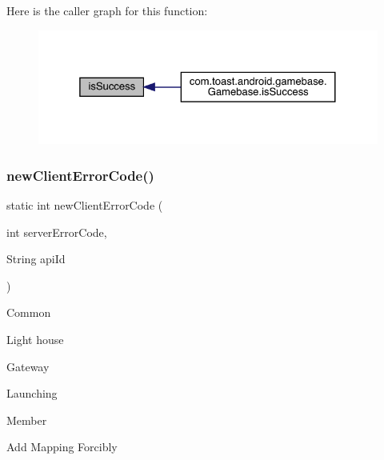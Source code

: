Here is the caller graph for this function\+:
\nopagebreak
\begin{figure}[H]
\begin{center}
\leavevmode
\includegraphics[width=325pt]{classcom_1_1toast_1_1android_1_1gamebase_1_1base_1_1_gamebase_error_a7d24434216b8c296f9c1382422267daf_icgraph}
\end{center}
\end{figure}
\mbox{\label{classcom_1_1toast_1_1android_1_1gamebase_1_1base_1_1_gamebase_error_ae1e31671405d6d3c4660aacf9d9dd3c5}} 
\subsubsection{\texorpdfstring{new\+Client\+Error\+Code()}{newClientErrorCode()}}
{\footnotesize\ttfamily static int new\+Client\+Error\+Code (\begin{DoxyParamCaption}\item[{int}]{server\+Error\+Code,  }\item[{String}]{api\+Id }\end{DoxyParamCaption})\hspace{0.3cm}{\ttfamily [static]}}

Common

Light house

Gateway

Launching

Member

Add Mapping Forcibly

